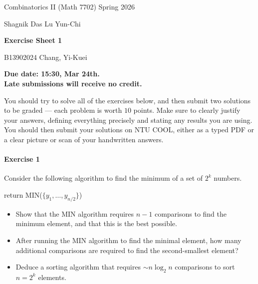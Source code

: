 \documentclass[a4paper,12pt]{article}
\newcommand{\courseTitle}{Combinatorics II (Math 7702)}
\newcommand{\semester}{Spring 2026}
\newcommand{\instructorA}{Shagnik Das}
\newcommand{\instructorB}{Lu Yun-Chi}
\newcommand{\sheetNumber}{1}
\newcommand{\dueDate}{15:30, Mar 24th.}
\newcommand{\lateWarning}{Late submissions will receive no credit.}
\newcommand{\buildtitle}[4]{
\begin{flushleft}
{\large
#1
\hfill{}
#2
\par
#3
}
\end{flushleft}
\vskip 4pt
\begin{center}
{\large\bfseries#4\par}
\end{center}
\bigskip
}
\begin{document}
\buildtitle{\courseTitle{}}{\semester}{\instructorA{} \hfill \instructorB{}}{Exercise Sheet \sheetNumber{}}

\vspace{-0.2in}

\begin{center}

{B13902024 Chang, Yi-Kuei}

{\bf Due date: \dueDate \\ \lateWarning}

\end{center}

\noindent You should try to solve all of the exercises below, and then submit two solutions to be graded --- each problem is worth $10$ points. Make sure to clearly justify your answers, defining everything precisely and stating any results you are using. You should then submit your solutions on NTU COOL, either as a typed PDF or a clear picture or scan of your handwritten answers.

\paragraph{Exercise 1}  Consider the following algorithm to find the minimum of a set of $2^k$ numbers.
\begin{algorithm}[H]
\medskip
{}
\medskip
{}
{}
{
return MIN($\{y_1, \hdots, y_{n/2}\}$)\;}
\end{algorithm}

\begin{itemize}
	\item[(a)] Show that the MIN algorithm requires $n-1$ comparisons to find the minimum element, and that this is the best possible.
	\item[(b)] After running the MIN algorithm to find the minimal element, how many additional comparisons are required to find the second-smallest element?
	\item[(c)] Deduce a sorting algorithm that requires $\sim n \log_2 n$ comparisons to sort $n = 2^k$ elements.
\end{itemize}
\end{document}
